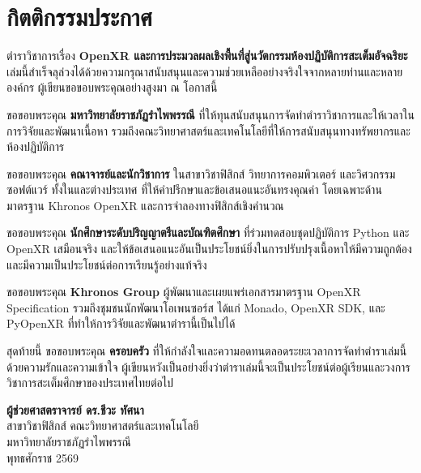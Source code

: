 \thispagestyle{empty}
\chapter*{กิตติกรรมประกาศ}

\noindent ตำราวิชาการเรื่อง \textbf{OpenXR และการประมวลผลเชิงพื้นที่สู่นวัตกรรมห้องปฏิบัติการสะเต็มอัจฉริยะ} เล่มนี้สำเร็จลุล่วงได้ด้วยความกรุณาสนับสนุนและความช่วยเหลืออย่างจริงใจจากหลายท่านและหลายองค์กร ผู้เขียนขอขอบพระคุณอย่างสูงมา ณ โอกาสนี้

\noindent ขอขอบพระคุณ \textbf{มหาวิทยาลัยราชภัฏรำไพพรรณี} ที่ให้ทุนสนับสนุนการจัดทำตำราวิชาการและให้เวลาในการวิจัยและพัฒนาเนื้อหา รวมถึงคณะวิทยาศาสตร์และเทคโนโลยีที่ให้การสนับสนุนทางทรัพยากรและห้องปฏิบัติการ

\noindent ขอขอบพระคุณ \textbf{คณาจารย์และนักวิชาการ} ในสาขาวิชาฟิสิกส์ วิทยาการคอมพิวเตอร์ และวิศวกรรมซอฟต์แวร์ ทั้งในและต่างประเทศ ที่ให้คำปรึกษาและข้อเสนอแนะอันทรงคุณค่า โดยเฉพาะด้านมาตรฐาน Khronos OpenXR และการจำลองทางฟิสิกส์เชิงคำนวณ

\noindent ขอขอบพระคุณ \textbf{นักศึกษาระดับปริญญาตรีและบัณฑิตศึกษา} ที่ร่วมทดสอบชุดปฏิบัติการ Python และ OpenXR เสมือนจริง และให้ข้อเสนอแนะอันเป็นประโยชน์ยิ่งในการปรับปรุงเนื้อหาให้มีความถูกต้องและมีความเป็นประโยชน์ต่อการเรียนรู้อย่างแท้จริง

\noindent ขอขอบพระคุณ \textbf{Khronos Group} ผู้พัฒนาและเผยแพร่เอกสารมาตรฐาน OpenXR Specification รวมถึงชุมชนนักพัฒนาโอเพนซอร์ส ได้แก่ Monado, OpenXR SDK, และ PyOpenXR ที่ทำให้การวิจัยและพัฒนาตำรานี้เป็นไปได้

\noindent สุดท้ายนี้ ขอขอบพระคุณ \textbf{ครอบครัว} ที่ให้กำลังใจและความอดทนตลอดระยะเวลาการจัดทำตำราเล่มนี้ด้วยความรักและความเข้าใจ ผู้เขียนหวังเป็นอย่างยิ่งว่าตำราเล่มนี้จะเป็นประโยชน์ต่อผู้เรียนและวงการวิชาการสะเต็มศึกษาของประเทศไทยต่อไป

\vspace{1.5cm}
\begin{flushright}
    {\bfseries\color{spatialBlue} ผู้ช่วยศาสตราจารย์ ดร.ชีวะ ทัศนา}\\[4pt]
    สาขาวิชาฟิสิกส์ คณะวิทยาศาสตร์และเทคโนโลยี\\
    มหาวิทยาลัยราชภัฏรำไพพรรณี\\[4pt]
    {\color{slateGrey} พุทธศักราช 2569}
\end{flushright}
\clearpage
